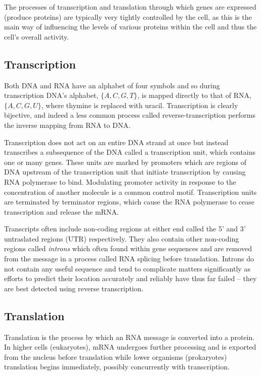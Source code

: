 The processes of transcription and translation through which genes are 
expressed (produce proteins) are typically very tightly
controlled by the cell, as this is the main way of influencing the levels of
various proteins within the cell and thus the cell's overall activity.

\subsection{Transcription}
\label{sec:transcription}

Both DNA and RNA have an alphabet of four symbols and so during transcription
DNA's alphabet, $\{A,C,G,T\}$, is mapped directly to that
of RNA, $\{A,C,G,U\}$, where thymine is replaced with uracil.
Transcription is clearly bijective, and indeed a less common process called
reverse-transcription performs the inverse mapping from RNA to DNA.

Transcription does not act on an entire DNA strand at once but instead
transcribes a subsequence of the DNA called a transcription unit, which
contains one or many genes.
These units are marked by promoters which are regions of DNA upstream
of the transcription unit that initiate transcription by causing RNA polymerase
to bind.
Modulating promoter activity in response to the concentration of another 
molecule is a common control motif.
Transcription units are terminated by terminator regions, which cause the RNA 
polymerase to cease transcription and release the mRNA.

Transcripts often include non-coding regions at either end called the 5' and 3'
untraslated regions (UTR) respectively.
They also contain other non-coding regions called \textit{introns}
which often found within gene sequences and are removed from the message in a 
process called RNA splicing before translation.
Introns do not contain any useful sequence and tend to complicate matters 
significantly as efforts to predict their location accurately and reliably 
have thus far failed -- they are best detected using reverse transcription.

\subsection{Translation}
\label{sec:translation}

Translation is the process by which an RNA message is converted into a protein.
In higher cells (eukaryotes), mRNA undergoes further processing and is exported
from the nucleus before translation while lower organisms (prokaryotes)
translation begins immediately, possibly concurrently with
transcription.

